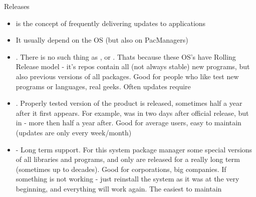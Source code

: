 \documentclass[usenames,dvipsnames,10pt,aspectratio=169]{beamer}
\begin{document}
\begin{frame}{Releases}
    \begin{itemize}
        \item {} is the concept of frequently delivering updates to applications
        \item It usually depend on the OS (but also on PacManagers)
        \item {}. There is no such thing as ,  or . Thats because these OS's have Rolling Release model - it's repos contain all (not always stable) new programs, but also previous versions of all packages. Good for people who like test new programs or languages, real geeks. Often updates require
        \item {}. Properly tested version of the product is released, sometimes half a year after it first appears. For example,  was in  two days after official release, but in  - more then half a year after. Good for average users, easy to maintain (updates are only every week/month)
        \item {} - Long term support. For this system package manager  some special versions of all libraries and programs, and only  are released for a really long term (sometimes up to decades). Good for corporations, big companies. If something is not working - just reinstall the system as it was at the very beginning, and everything will work again. The easiest to maintain
    \end{itemize}
\end{frame}
\end{document}
